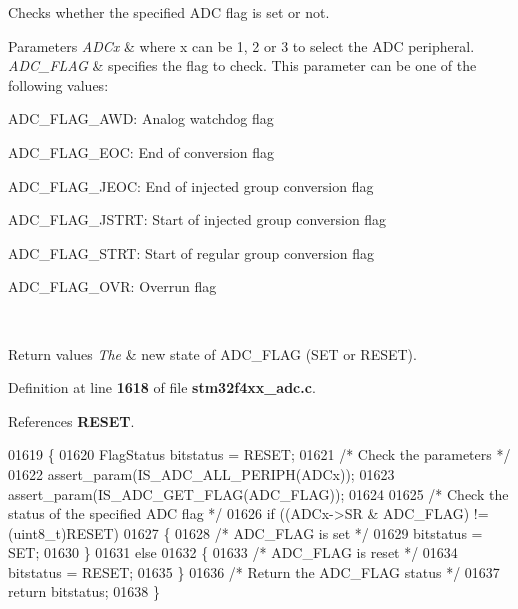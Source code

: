 Checks whether the specified A\+DC flag is set or not. 


\begin{DoxyParams}{Parameters}
{\em A\+D\+Cx} & where x can be 1, 2 or 3 to select the A\+DC peripheral. \\
\hline
{\em A\+D\+C\+\_\+\+F\+L\+AG} & specifies the flag to check. This parameter can be one of the following values\+: \begin{DoxyItemize}
\item A\+D\+C\+\_\+\+F\+L\+A\+G\+\_\+\+A\+WD\+: Analog watchdog flag \item A\+D\+C\+\_\+\+F\+L\+A\+G\+\_\+\+E\+OC\+: End of conversion flag \item A\+D\+C\+\_\+\+F\+L\+A\+G\+\_\+\+J\+E\+OC\+: End of injected group conversion flag \item A\+D\+C\+\_\+\+F\+L\+A\+G\+\_\+\+J\+S\+T\+RT\+: Start of injected group conversion flag \item A\+D\+C\+\_\+\+F\+L\+A\+G\+\_\+\+S\+T\+RT\+: Start of regular group conversion flag \item A\+D\+C\+\_\+\+F\+L\+A\+G\+\_\+\+O\+VR\+: Overrun flag \end{DoxyItemize}
\\
\hline
\end{DoxyParams}

\begin{DoxyRetVals}{Return values}
{\em The} & new state of A\+D\+C\+\_\+\+F\+L\+AG (S\+ET or R\+E\+S\+ET). \\
\hline
\end{DoxyRetVals}


Definition at line \textbf{ 1618} of file \textbf{ stm32f4xx\+\_\+adc.\+c}.



References \textbf{ R\+E\+S\+ET}.


\begin{DoxyCode}
01619 \{
01620   FlagStatus bitstatus = RESET;
01621   \textcolor{comment}{/* Check the parameters */}
01622   assert_param(IS_ADC_ALL_PERIPH(ADCx));
01623   assert_param(IS_ADC_GET_FLAG(ADC\_FLAG));
01624 
01625   \textcolor{comment}{/* Check the status of the specified ADC flag */}
01626   \textcolor{keywordflow}{if} ((ADCx->SR & ADC\_FLAG) != (uint8\_t)RESET)
01627   \{
01628     \textcolor{comment}{/* ADC\_FLAG is set */}
01629     bitstatus = SET;
01630   \}
01631   \textcolor{keywordflow}{else}
01632   \{
01633     \textcolor{comment}{/* ADC\_FLAG is reset */}
01634     bitstatus = RESET;
01635   \}
01636   \textcolor{comment}{/* Return the ADC\_FLAG status */}
01637   \textcolor{keywordflow}{return}  bitstatus;
01638 \}
\end{DoxyCode}
\mbox{\label{group__ADC__Group7_gaa1d3b910a83dbf14d4f68c8eef058612}} 

